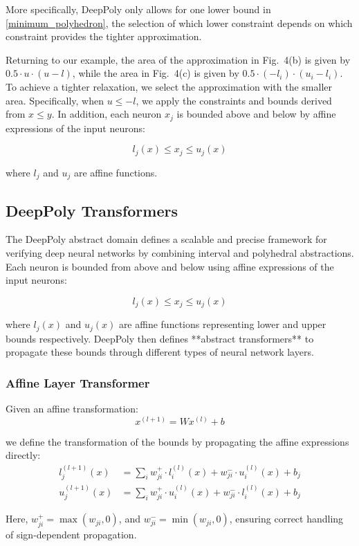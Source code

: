 \documentclass[oneside,11pt,dvipsnames]{book}
\numberwithin{equation}{section}
\theoremstyle{definition}
\theoremstyle{remark}
\begin{document}
More specifically,  DeepPoly only allows for one lower bound in \ref{minimum_polyhedron}, the selection of which lower constraint depends on which constraint provides the tighter approximation.

Returning to our example, the area of the approximation in Fig.~4(b) is given by \( 0.5 \cdot u \cdot (u - l) \), while the area in Fig.~4(c) is given by \( 0.5 \cdot (-l_i) \cdot (u_i - l_i) \). To achieve a tighter relaxation, we select the approximation with the smaller area. Specifically, when \( u \leq -l \), we apply the constraints and bounds derived from \(x \leq y\).
In addition, each neuron \(x_j\) is bounded above and below by affine expressions of the input neurons:

\[
l_j(x) \leq x_j \leq u_j(x)
\]

where \(l_j\) and \(u_j\) are affine functions.

\subsection{DeepPoly Transformers}

The DeepPoly abstract domain defines a scalable and precise framework for verifying deep neural networks by combining interval and polyhedral abstractions. Each neuron is bounded from above and below using affine expressions of the input neurons:

\[
l_j(x) \leq x_j \leq u_j(x)
\]

where \(l_j(x)\) and \(u_j(x)\) are affine functions representing lower and upper bounds respectively. DeepPoly then defines **abstract transformers** to propagate these bounds through different types of neural network layers.

\subsubsection{Affine Layer Transformer}

Given an affine transformation:
\[
x^{(l+1)} = W x^{(l)} + b
\]

we define the transformation of the bounds by propagating the affine expressions directly:
\begin{align*}
l_j^{(l+1)}(x) &= \sum_i w_{ji}^+ \cdot l_i^{(l)}(x) + w_{ji}^- \cdot u_i^{(l)}(x) + b_j \\
u_j^{(l+1)}(x) &= \sum_i w_{ji}^+ \cdot u_i^{(l)}(x) + w_{ji}^- \cdot l_i^{(l)}(x) + b_j
\end{align*}

Here, \(w^+_{ji} = \max(w_{ji}, 0)\), and \(w^-_{ji} = \min(w_{ji}, 0)\), ensuring correct handling of sign-dependent propagation.
\end{document}

